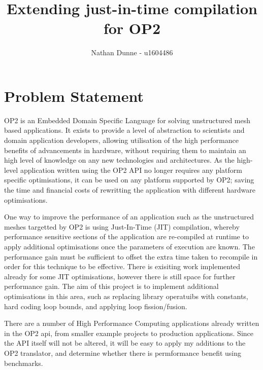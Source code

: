 \documentclass[11pt]{article}
\title{Extending just-in-time compilation for OP2}
\author{Nathan Dunne - u1604486}
\begin{document}
\maketitle
\section*{Problem Statement}
OP2 is an Embedded Domain Specific Language for solving unstructured mesh based applications. It exists to provide a level of abstraction to scientists and domain application developers, allowing utilisation of the high performance benefits of advancements in hardware, without requiring them to maintain an high level of knowledge on any new technologies and architectures. As the high-level application written using the OP2 API no longer requires any platform specific optimisations, it can be used on any platform supported by OP2; saving the time and financial costs of rewritting the application with different hardware optimisations.
\newline
\par
One way to improve the performance of an application such as the unstructured meshes targetted by OP2 is using Just-In-Time (JIT) compilation, whereby performance sensitive sections of the application are re-compiled at runtime to apply additional optimisations once the parameters of execution are known. The performance gain must be sufficient to offset the extra time taken to recompile in order for this technique to be effective. There is exisiting work implemented already for some JIT optimisations, however there is still space for further performance gain. The aim of this project is to implement additional optimisations in this area, such as replacing library operatuibs with constants, hard coding loop bounds, and applying loop fission/fusion.
\newline
\par
There are a number of High Performance Computing applications already written in the OP2 api, from smaller example projects to production applications. Since the API itself will not be altered, it will be easy to apply my additions to the OP2 translator, and determine whether there is permformance benefit using benchmarks.
\end{document}
